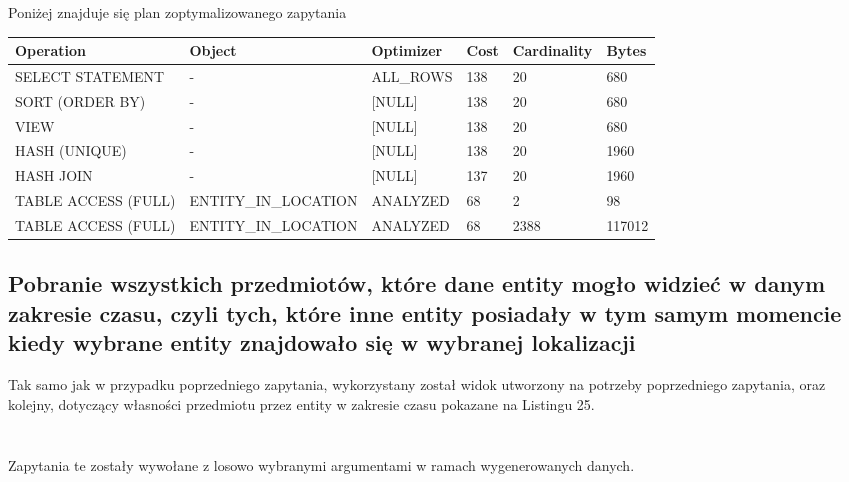 \documentclass[11pt]{article}
\numberwithin{figure}{subsection}
\begin{document}
		Poniżej znajduje się plan zoptymalizowanego zapytania \\
		
		\begin{tabularx}{\textwidth}{|X|X|X|X|X|X|}
Operation&Object&Optimizer&Cost&Cardinality&Bytes\\ \hline
SELECT STATEMENT& - &ALL\_ROWS&138&20&680\\ \hline
SORT (ORDER BY)& - &[NULL]&138&20&680\\ \hline
VIEW& - &[NULL]&138&20&680\\ \hline
HASH (UNIQUE)& - &[NULL]&138&20&1960\\ \hline
HASH JOIN& - &[NULL]&137&20&1960\\ \hline
TABLE ACCESS (FULL)&ENTITY\_IN\_LOCATION&ANALYZED&68&2&98\\ \hline
TABLE ACCESS (FULL)&ENTITY\_IN\_LOCATION&ANALYZED&68&2388&117012\\ \hline
		\end{tabularx}
		

		
		
		
		
		
		
		
		
		
		
	
	\subsection{Pobranie wszystkich przedmiotów, które dane entity mogło widzieć
	w danym zakresie czasu, czyli tych, które inne entity posiadały w tym samym
	momencie kiedy wybrane entity znajdowało się w wybranej lokalizacji}
	
		Tak samo jak w przypadku poprzedniego zapytania, wykorzystany został
		widok utworzony na potrzeby poprzedniego zapytania, oraz kolejny,
		dotyczący własności przedmiotu przez entity w zakresie czasu pokazane na
		Listingu 25.
			
		\begin{lstlisting}[caption={Wersja niezoptymalizowana},captionpos=b]
		\end{lstlisting}
			
		\begin{lstlisting}[caption={Wersja zoptymalizowana},captionpos=b]
		\end{lstlisting}
		
		Zapytania te zostały wywołane z losowo wybranymi argumentami w ramach
		wygenerowanych danych. \\
		
\end{document}
